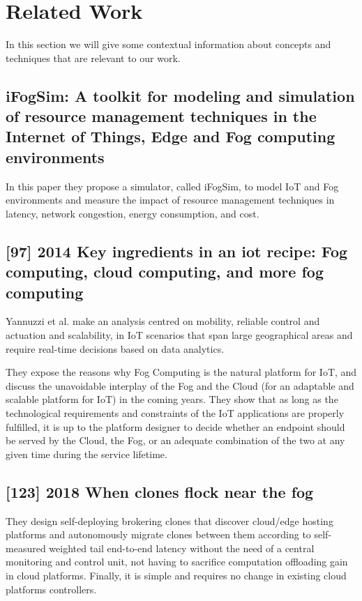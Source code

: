 \vfill
\pagebreak
\section{Related Work}
\label{sec:RelatedWork}

In this section we will give some contextual information about concepts and techniques that are relevant to our work.

\subsection{iFogSim: A toolkit for modeling and simulation of resource management techniques in the Internet of Things, Edge and Fog computing environments}
\label{subsec:paper01} \cite{gupta2017ifogsim}
In this paper they propose a simulator, called iFogSim, to model IoT and Fog environments and measure the impact of resource management techniques in latency, network congestion, energy consumption, and cost.

\subsection{[97] 2014 Key ingredients in an iot recipe: Fog computing, cloud computing, and more fog computing}
\label{subsec:paper02}
Yannuzzi et al. \cite{yannuzzi2014key} make an analysis centred on mobility, reliable control and actuation and scalability, in IoT scenarios that span large geographical areas and require real-time decisions based on data analytics. 

They expose the reasons why Fog Computing is the natural platform for IoT, and discuss the unavoidable interplay of the Fog and the Cloud (for an adaptable and scalable platform for IoT) in the coming years. They show that as long as the technological requirements and constraints of the IoT applications are properly fulfilled, it is up to the platform designer to decide whether an endpoint should be served by the Cloud, the Fog, or an adequate combination of the two at any given time during the service lifetime.

\subsection{[123] 2018 When clones flock near the fog}
\label{subsec:paper03} \cite{abdelwahab2018clones}
They design self-deploying brokering clones that discover cloud/edge hosting platforms and autonomously migrate clones between them according to self-measured weighted tail end-to-end latency without the need of a central monitoring and control unit, not having to sacrifice computation offloading gain in cloud platforms. Finally, it is simple and requires no change in existing cloud platforms controllers.

